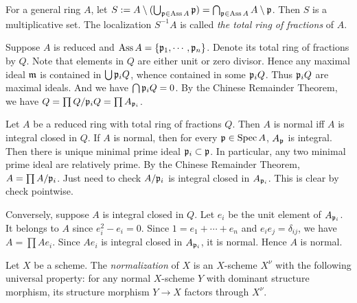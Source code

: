     \begin{remark}\label{rmk: total ring of fractions and normality of general reduced ring}
        For a general ring $A$, let $S := A\setminus (\bigcup_{{\mathfrak{p}} \in \operatorname{Ass} A} {\mathfrak{p}}) = \bigcap_{{\mathfrak{p}} \in \operatorname{Ass} A}A\setminus {\mathfrak{p}}$.
        Then $S$ is a multiplicative set.
        The localization $S^{-1}A$ is called \textit{the total ring of fractions} of $A$.
        
        Suppose $A$ is reduced and $\operatorname{Ass} A = \{{\mathfrak{p}}_1,\cdots,{\mathfrak{p}}_n\}$.
        Denote its total ring of fractions by $Q$.
        Note that elements in $Q$ are either unit or zero divisor.
        Hence any maximal ideal ${\mathfrak{m}}$ is contained in $\bigcup {\mathfrak{p}}_iQ$, whence contained in some ${\mathfrak{p}}_i Q$.
        Thus ${\mathfrak{p}}_i Q$ are maximal ideals.
        And we have $\bigcap {\mathfrak{p}}_i Q = 0$. 
        By the Chinese Remainder Theorem, we have $Q = \prod Q/{{\mathfrak{p}}_i}Q = \prod A_{{\mathfrak{p}}_i}$.
        
        Let $A$ be a reduced ring with total ring of fractions $Q$.
        Then $A$ is normal iff $A$ is integral closed in $Q$.
        If $A$ is normal, then for every ${\mathfrak{p}} \in \operatorname{Spec} A$, $A_{\mathfrak{p}}$ is integral.
        Then there is unique minimal prime ideal ${\mathfrak{p}}_i \subset {\mathfrak{p}}$.
        In particular, any two minimal prime ideal are relatively prime.
        By the Chinese Remainder Theorem, $A = \prod A/{\mathfrak{p}}_i$.
        Just need to check $A/{\mathfrak{p}}_i$ is integral closed in $A_{{\mathfrak{p}}_i}$.
        This is clear by check pointwise.

        Conversely, suppose $A$ is integral closed in $Q$.
        Let $e_i$ be the unit element of $A_{{\mathfrak{p}}_i}$.
        It belongs to $A$ since $e_i^2 - e_i = 0$.
        Since $1 = e_1 + \cdots + e_n$ and $e_ie_j = \delta_{ij}$, we have $A = \prod Ae_i$.
        Since $Ae_i$ is integral closed in $A_{{\mathfrak{p}}_i}$, it is normal.
        Hence $A$ is normal.
    \end{remark}

    \begin{definition}
        Let $X$ be a scheme.
        The \textit{normalization} of $X$ is an $X$-scheme $X^\nu$ with the following universal property:
        for any normal $X$-scheme $Y$ with dominant structure morphism, its structure morphism $Y \to X$ factors through $X^\nu$.
    \end{definition}

